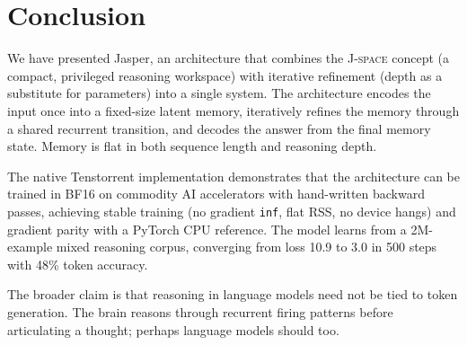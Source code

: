 \documentclass[11pt,a4paper]{article}
\newcommand{\jspace}{\textsc{J-space}}
\begin{document}
\section{Conclusion}

We have presented Jasper, an architecture that combines the \jspace{} concept (a compact, privileged reasoning workspace) with iterative refinement (depth as a substitute for parameters) into a single system. The architecture encodes the input once into a fixed-size latent memory, iteratively refines the memory through a shared recurrent transition, and decodes the answer from the final memory state. Memory is flat in both sequence length and reasoning depth.

The native Tenstorrent implementation demonstrates that the architecture can be trained in BF16 on commodity AI accelerators with hand-written backward passes, achieving stable training (no gradient \texttt{inf}, flat RSS, no device hangs) and gradient parity with a PyTorch CPU reference. The model learns from a 2M-example mixed reasoning corpus, converging from loss 10.9 to 3.0 in 500 steps with 48\% token accuracy.

The broader claim is that reasoning in language models need not be tied to token generation. The brain reasons through recurrent firing patterns before articulating a thought; perhaps language models should too.

\end{document}
